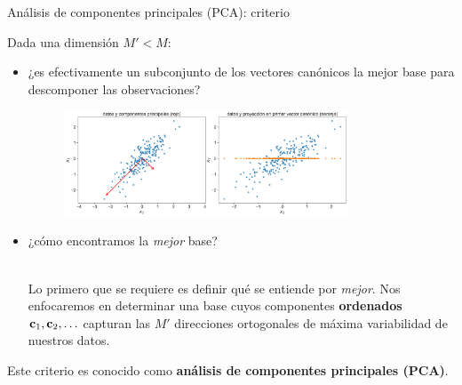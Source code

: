 \documentclass[9pt, handout]{beamer}
\begin{document}
\begin{frame}{Análisis de componentes principales (PCA): criterio}
	
	Dada una dimensión $M'<M$:    	
	\begin{itemize}
		\item ¿es efectivamente un subconjunto de los vectores canónicos la mejor base para descomponer las observaciones? \pause 
		\begin{figure}[H]
	\centering
	\includegraphics[width=0.8\textwidth]{../../img/cap6_pca.pdf}
	\end{figure}\pause 	

		\item ¿cómo encontramos la \emph{mejor} base?\\~\ \pause
		
		Lo primero que se requiere es definir qué se entiende por \emph{mejor}. Nos enfocaremos en determinar una base cuyos componentes \textbf{ordenados} $\mathbf{c}_1,\mathbf{c}_2,\ldots$ capturan las $M'$ direcciones ortogonales de máxima variabilidad de nuestros datos.
	\end{itemize}
	Este criterio es conocido como \textbf{análisis de componentes principales (PCA)}.
\end{frame}
\end{document}
